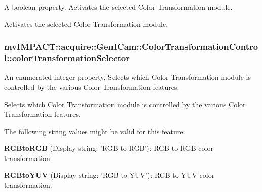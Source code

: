 A boolean property. Activates the selected Color Transformation module. 

Activates the selected Color Transformation module. \hypertarget{classmv_i_m_p_a_c_t_1_1acquire_1_1_gen_i_cam_1_1_color_transformation_control_a0f0956bfabf69ad85a2d2bbe3a91754c}{
\subsubsection[{color\+Transformation\+Selector}]{ mv\+I\+M\+P\+A\+C\+T\+::acquire\+::\+Gen\+I\+Cam\+::\+Color\+Transformation\+Control\+::color\+Transformation\+Selector}}\label{classmv_i_m_p_a_c_t_1_1acquire_1_1_gen_i_cam_1_1_color_transformation_control_a0f0956bfabf69ad85a2d2bbe3a91754c}


An enumerated integer property. Selects which Color Transformation module is controlled by the various Color Transformation features. 

Selects which Color Transformation module is controlled by the various Color Transformation features.

The following string values might be valid for this feature\+:
\begin{DoxyItemize}
\item {\bfseries R\+G\+Bto\+R\+G\+B} (Display string\+: 'R\+G\+B to R\+G\+B')\+: R\+G\+B to R\+G\+B color transformation.
\item {\bfseries R\+G\+Bto\+Y\+U\+V} (Display string\+: 'R\+G\+B to Y\+U\+V')\+: R\+G\+B to Y\+U\+V color transformation.
\end{DoxyItemize}

